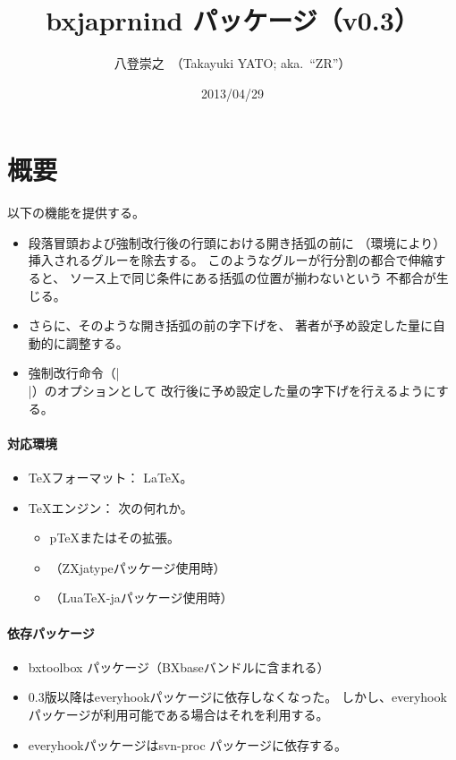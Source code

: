 \documentclass[a4paper]{ltjsarticle}
\newcommand{\PkgVersion}{0.3}
\newcommand{\Pkg}[1]{\textsf{#1}}
\providecommand{\pTeX}{p\TeX}
\begin{document}
\title{\Pkg{bxjaprnind} パッケージ（v\PkgVersion）}
\author{八登崇之\ （Takayuki YATO; aka.~``ZR''）}
\date{2013/04/29}
\maketitle

\section{概要}

以下の機能を提供する。
\begin{itemize}
\item 段落冒頭および強制改行後の行頭における開き括弧の前に
  （環境により）挿入されるグルーを除去する。
  このようなグルーが行分割の都合で伸縮すると、
  ソース上で同じ条件にある括弧の位置が揃わないという
  不都合が生じる。
\item さらに、そのような開き括弧の前の字下げを、
  著者が予め設定した量に自動的に調整する。
\item 強制改行命令（|\\|）のオプションとして
  改行後に予め設定した量の字下げを行えるようにする。
\end{itemize}

\paragraph{対応環境}
\begin{itemize}
\item {\TeX}フォーマット： \LaTeX。
\item {\TeX}エンジン： 次の何れか。
\begin{itemize}
\item {\pTeX}またはその拡張。
\item {\XeTeX}（\Pkg{ZXjatype}パッケージ使用時）
\item {\LuaTeX}（\Pkg{LuaTeX-ja}パッケージ使用時）
\end{itemize}
\end{itemize}

\paragraph{依存パッケージ}
\begin{itemize}
\item \Pkg{bxtoolbox} パッケージ（\Pkg{BXbase}バンドルに含まれる）
\item 0.3版以降は\Pkg{everyhook}パッケージに依存しなくなった。
しかし、\Pkg{everyhook}パッケージが利用可能である場合はそれを利用する。
\item \Pkg{everyhook}パッケージは\Pkg{svn-proc} パッケージに依存する。
\end{itemize}
\end{document}
